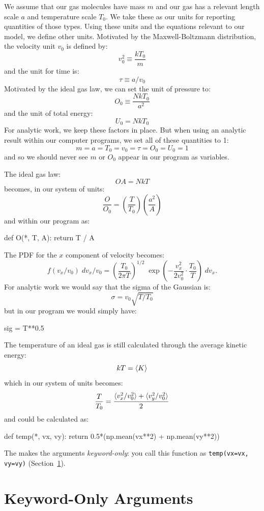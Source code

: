 \documentclass[12pt]{article}
\begin{document}
We assume that our gas molecules have mass $m$ and our gas has a
relevant length scale $a$ and temperature scale $T_0$.  We take these
as our units for reporting quantities of those types.  Using these
units and the equations relevant to our model, we define other units.
Motivated by the Maxwell-Boltzmann distribution, the velocity unit
$v_0$ is defined by:
$$ v_0^2 \equiv \frac{k T_0}{m}$$
and the unit for time is:
$$ \tau \equiv a / v_0$$
Motivated by the ideal gas law, we can set the unit of pressure to:
$$O_0 \equiv \frac{NkT_0}{a^2}$$
and the unit of total energy:
$$U_0 = N k T_0$$
For analytic work, we keep these factors in place.  But when using an
analytic result within our computer programs, we set all of these
quantities to 1:
$$m = a = T_0 = v_0 = \tau = O_0 = U_0 = 1$$
and so we should never see $m$ or $O_0$ appear in our program as variables.

The ideal gas law:
$$O A = N k T$$
becomes, in our system of units:
\begin{equation}
\label{eqn:iglaw}
\frac{O}{O_0} = \left( \frac{T}{T_0} \right) \left( \frac{a^2}{A} \right) 
\end{equation}
and within our program as:
\begin{python}
  def O(*, T, A):
       return T / A
\end{python}
The PDF for the $x$ component of velocity becomes:
\begin{equation}
f(v_x/v_0) \; dv_x/v_0 = \left( \frac{T_0}{2\pi T} \right)^{1/2} \; \exp \left(-\frac{v_x^2}{2v_0^2} \cdot \frac{T_0}{T}\right) \; dv_x. 
\end{equation}
For analytic work we would say that the sigma of the Gaussian is:
$$\sigma = v_0 \sqrt{T / T_0}$$
but in our program we would simply have:
\begin{python}
  sig = T**0.5
\end{python}
The temperature of an ideal gas is still calculated through the average kinetic energy:
$$kT = \braket{K}$$
which in our system of units becomes:
$$\frac{T}{T_0} = \frac{\braket{v_x^2/v_0^2} + \braket{v_y^2/v_0^2}}{2}$$
and could be calculated as:
\begin{python}
def temp(*, vx, vy):
     return 0.5*(np.mean(vx**2) + np.mean(vy**2))
\end{python}
The {\tt *} makes the arguments {\em keyword-only}: you call this function as {\tt temp(vx=vx, vy=vy)}
(Section~\ref{sec:kwonly}).

\section{Keyword-Only Arguments}
\label{sec:kwonly}
\end{document}
